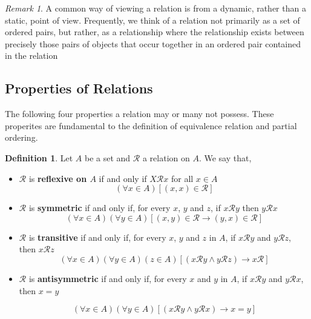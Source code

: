\documentclass{book}
\theoremstyle{definition}
\newtheorem{definition}{Definition}[section]
\theoremstyle{remark}
\newtheorem{remark}{Remark}
\newcommand{\cc}[1]{\mathcal{#1}}
\begin{document}
    
    \begin{remark}
        A common way of viewing a relation is from a dynamic, rather than a static, point of view. Frequently, we think of a relation not primarily as a set of ordered pairs, but rather, as a relationship where the relationship exists between precisely those pairs of objects that occur together in an ordered pair contained in the relation
    \end{remark}
    
    

\newpage
\subsection{Properties of Relations}

    The following four properties a relation may or many not possess. These properites are fundamental to the definition of equivalence relation and partial ordering. 
    
    \begin{definition}
        Let $A$ be a set and $\cc{R}$ a relation on $A$. We say that,
            \begin{itemize}
                \item $\cc{R}$ is \textbf{reflexive on $A$} if and only if $X \cc{R} x$ for all $x \in A$
                    \begin{equation*}
                        (\forall x \in A)[(x,x) \in \cc{R}]
                    \end{equation*}
                    
                    \item $\cc{R}$ is \textbf{symmetric} if and only if, for every $x$, $y$ and $z$, if $x \cc{R} y$ then $y \cc{R} x$
                    \begin{equation*}
                        (\forall x \in A)(\forall y \in A)[(x,y) \in \cc{R} \to (y,x) \in \cc{R}]
                    \end{equation*}
                    
                    \item $\cc{R}$ is \textbf{transitive} if and only if, for every $x$, $y$ and $z$ in $A$, if $x \cc{R} y$ and $y \cc{R} z$, then $x \cc{R} z$
                    \begin{equation*}
                        (\forall x \in A)(\forall y \in A)(z \in A)[(x \cc{R} y \wedge y \cc{R} z) \to x \cc{R}]
                    \end{equation*}
                    
                    \item $\cc{R}$ is \textbf{antisymmetric} if and only if, for every $x$ and $y$ in $A$, if $x \cc{R} y$ and $y \cc{R} x$, then $x=y$  
    
                    \begin{equation*}
                        (\forall x \in A)(\forall y \in A)[(x \cc{R} y \wedge y \cc{R} x) \to x=y]
                    \end{equation*}
            \end{itemize}
    \end{definition}
    
\end{document}
